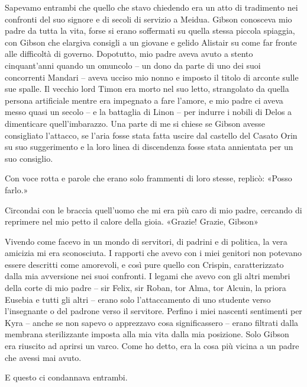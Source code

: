 Sapevamo entrambi che quello che stavo chiedendo era un atto di
tradimento nei confronti del suo signore e di secoli di servizio a
Meidua. Gibson conosceva mio padre da tutta la vita, forse si erano
soffermati su quella stessa piccola spiaggia, con Gibson che elargiva
consigli a un giovane e gelido Alistair su come far fronte alle
difficoltà di governo. Dopotutto, mio padre aveva avuto a stento
cinquant'anni quando un omuncolo -- un dono da parte di uno dei suoi
concorrenti Mandari -- aveva ucciso mio nonno e imposto il titolo di
arconte sulle sue spalle. Il vecchio lord Timon era morto nel suo letto,
strangolato da quella persona artificiale mentre era impegnato a fare
l'amore, e mio padre ci aveva messo quasi un secolo -- e la battaglia di
Linon -- per indurre i nobili di Delos a dimenticare quell'imbarazzo.
Una parte di me si chiese se Gibson avesse consigliato l'attacco, se
l'aria fosse stata fatta uscire dal castello del Casato Orin su suo
suggerimento e la loro linea di discendenza fosse stata annientata per
un suo consiglio.

Con voce rotta e parole che erano solo frammenti di loro stesse,
replicò: «Posso farlo.»

Circondai con le braccia quell'uomo che mi era più caro di mio padre,
cercando di reprimere nel mio petto il calore della gioia. «Grazie!
Grazie, Gibson»

Vivendo come facevo in un mondo di servitori, di padrini e di politica,
la vera amicizia mi era sconosciuta. I rapporti che avevo con i miei
genitori non potevano essere descritti come amorevoli, e così pure
quello con Crispin, caratterizzato dalla mia avversione nei suoi
confronti. I legami che avevo con gli altri membri della corte di mio
padre -- sir Felix, sir Roban, tor Alma, tor Alcuin, la priora Eusebia e
tutti gli altri -- erano solo l'attaccamento di uno studente verso
l'insegnante o del padrone verso il servitore. Perfino i miei nascenti
sentimenti per Kyra -- anche se non sapevo o apprezzavo cosa
significassero -- erano filtrati dalla membrana sterilizzante imposta
alla mia vita dalla mia posizione. Solo Gibson era riuscito ad aprirsi
un varco. Come ho detto, era la cosa più vicina a un padre che avessi
mai avuto.

E questo ci condannava entrambi.

